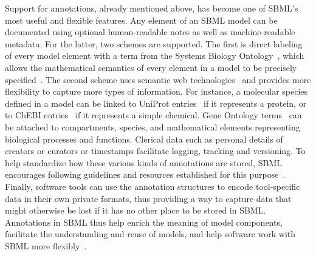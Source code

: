 \documentclass[]{draft-sbml-paper}
\begin{document}
Support for annotations, already mentioned above, has become one of SBML's most useful and flexible features.  Any element of an SBML model can be documented using optional human-readable notes as well as machine-readable metadata.  For the latter, two schemes are supported.  The first is direct labeling of every model element with a term from the Systems Biology Ontology~\citep{courtot2011controlled}, which allows the mathematical semantics of every element in a model to be precisely specified~\citep{LeNovere2006model}.  The second scheme uses semantic web technologies~\citep{lassila_resource_1999} and provides more flexibility to capture more types of information.  For instance, a molecular species defined in a model can be linked to UniProt entries~\citep{uniprot2017} if it represents a protein, or to ChEBI entries~\citep{hastings2013chebi} if it represents a simple chemical.  Gene Ontology terms~\citep{ashburner2000gene} can be attached to compartments, species, and mathematical elements representing biological processes and functions. Clerical data such as personal details of creators or curators or timestamps facilitate logging, tracking and versioning.  To help standardize how these various kinds of annotations are stored, SBML encourages following guidelines and resources established for this purpose~\citep{le_novere_2005, Laibe2007miriam, krause2011chapter, Juty2012identifiers}.  Finally, software tools can use the annotation structures to encode tool-specific data in their own private formats, thus providing a way to capture data that might otherwise be lost if it has no other place to be stored in SBML.  Annotations in SBML thus help enrich the meaning of model components, facilitate the understanding and reuse of models, and help software work with SBML more flexibly~\citep{Neal2019harmonizing, Wolstencroft2015seek, krause2011chapter, Alm2015annotationbased, schulz2011retrieval, Wittig2017data, Lister2010annotation, Nguyen2016converter, Schulz2012propagating, Swainston2009libannotationsbml}.
\end{document}
